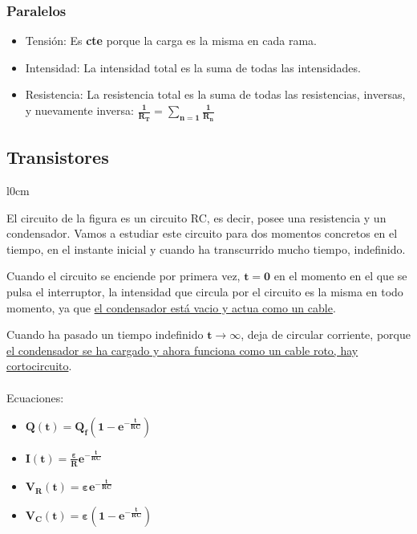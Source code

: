 \subsubsection{Paralelos}
\begin{itemize}
        \item Tensión: Es \textbf{cte} porque la carga es la misma en cada rama.
        \item Intensidad: La intensidad total es la suma de todas las intensidades.
        \item Resistencia: La resistencia total es la suma de todas las resistencias, inversas, y nuevamente inversa: \(\bm{\frac{1}{R_T} = \sum_{n = 1}\frac{1}{R_n}}\)
\end{itemize}
\subsection{Transistores}
\begin{wrapfigure}{l}{0cm}
\end{wrapfigure}
\noindent El circuito de la figura es un circuito RC, es decir, posee una resistencia y un condensador.
Vamos a estudiar este circuito para dos momentos concretos en el tiempo, en el instante inicial y cuando ha transcurrido mucho tiempo, indefinido.
\vspace{.5cm}
\par \noindent Cuando el circuito se enciende por primera vez, \(\bm{t = 0}\) en el momento en el que se pulsa el interruptor, la intensidad que circula por el circuito es la misma en todo momento, ya que \underline{el condensador está vacio y actua como un cable}.
\vspace{.5cm}
\par \hspace{-0.3cm}Cuando ha pasado un tiempo indefinido \(\bm{t \rightarrow \infty}\), deja de circular corriente, porque \underline{el condensador se ha cargado y ahora funciona como un cable roto, hay cortocircuito}.
\\
\\
\noindent Ecuaciones:
\begin{itemize}
        \item \(\bm{Q(t)=Q_f(1-e^{-\frac{t}{RC}})}\)
        \item \(\bm{I(t)=\frac{\varepsilon}{R}e^{-\frac{t}{RC}}}\)
        \item \(\bm{V_R(t) = \varepsilon e^{-\frac{t}{RC}}}\)
        \item \(\bm{V_C(t) = \varepsilon(1-e^{-\frac{t}{RC}})}\)
\end{itemize}
